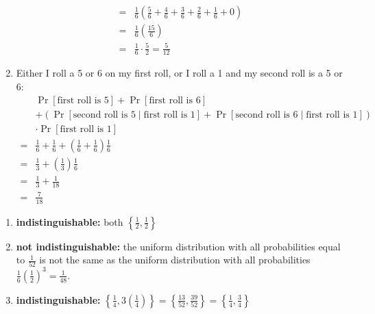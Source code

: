 \begin{answer}
\begin{enumerate}
\begin{align*}
            =& \frac{1}{6} \left(
                \frac{5}{6}+\frac{4}{6}+\frac{3}{6}+\frac{2}{6}+\frac{1}{6}+0
            \right)\\
            =& \frac{1}{6} \left( \frac{15}{6}\right)\\
            =& \frac{1}{6} \cdot \frac{5}{2} = \frac{5}{12}
        \end{align*}
        \item Either I roll a 5 or 6 on my first roll, or I roll a 1 and my second roll is 
        a 5 or 6:
        \begin{align*}
            &\Pr[\text{first roll is }5]
            +\Pr[\text{first roll is }6]\\
            &+\left(\Pr[\text{second roll is }5 \mid \text{first roll is }1]+
            \Pr[\text{second roll is }6 \mid \text{first roll is }1]\right)\\
            &\cdot\Pr[\text{first roll is }1]\\
            =&\frac{1}{6}+\frac{1}{6}+\left(\frac{1}{6}+\frac{1}{6}\right)\frac{1}{6}\\
            =&\frac{1}{3}+\left(\frac{1}{3}\right)\frac{1}{6}\\
            =&\frac{1}{3}+\frac{1}{18}\\
            =&\frac{7}{18}
        \end{align*}
    \end{enumerate}
\end{answer}

\begin{answer}
    \renewcommand{\labelenumi}{(\alph{enumi})}
    \begin{enumerate}
        \item \textbf{indistinguishable:} 
        both $\left\{\frac{1}{2},\frac{1}{2}\right\}$
        \item \textbf{not indistinguishable:}
        the uniform distribution with all probabilities equal to 
        $\frac{1}{52}$ is not the same as the uniform distribution 
        with all probabilities $\frac{1}{6}\left(\frac{1}{2}\right)^3 
        = \frac{1}{48}$.
        \item \textbf{indistinguishable:}
        $\left\{\frac{1}{4},3\left(\frac{1}{4}\right)\right\} 
        = \left\{\frac{13}{52},\frac{39}{52}\right\} 
        = \left\{\frac{1}{4},\frac{3}{4}\right\}$
    \end{enumerate}
\end{answer}
